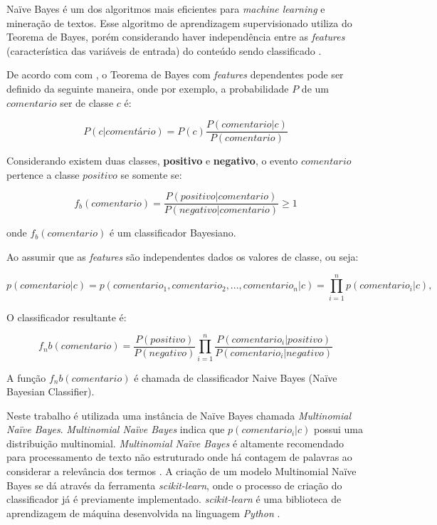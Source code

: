 Naïve Bayes é um dos algoritmos mais eficientes para \textit{machine learning} e mineração de textos. Esse algoritmo de aprendizagem supervisionado utiliza do Teorema de Bayes, porém considerando haver independência entre as \textit{features} (característica das variáveis de entrada) do conteúdo sendo classificado \cite{zhang2004optimalitybayes}.

De acordo com com \cite{zhang2004optimalitybayes}, o Teorema de Bayes com \textit{features} dependentes pode ser definido da seguinte maneira, onde por exemplo, a probabilidade $P$ de um $comentario$ ser de classe $c$ é:

\begin{equation}
\label{eq:bayes_classic}
 P(c|comentário) = P(c) \frac{P(comentario |c)}{P(comentario)}
\end{equation}

Considerando existem duas classes, \textbf{positivo} e \textbf{negativo}, o evento $comentario$ pertence a classe $positivo$ se somente se:

\begin{equation}
\label{eq:bayes_classic}
 {f_b}(comentario) =  \frac{P(positivo| comentario)}{P(negativo| comentario)} \geq 1
 
\end{equation}

onde ${f_b}(comentario)$ é um classificador Bayesiano.

Ao assumir que as \textit{features} são independentes dados os valores de classe, ou seja:

\begin{equation}
\label{eq:naive_bayes}
 {p}(comentario|c) =  {p}({comentario_1, comentario_2, ..., comentario_n}|c) = \prod_{i=1}^{n} {p}(comentario_i|c),
\end{equation}

O classificador resultante é:

\begin{equation}
\label{eq:bayes_classic}
 {f_nb}(comentario) =  \frac{P(positivo)}{P(negativo)} \prod_{i=1}^{n} \frac{P({comentario_i} | positivo)}{P({comentario_i} | negativo)}
\end{equation}

A função ${f_nb}(comentario)$ é chamada de classificador Naive Bayes (Naïve Bayesian Classifier).


Neste trabalho é utilizada uma instância de Naïve Bayes chamada \textit{Multinomial Naïve Bayes}. \textit{Multinomial Naïve Bayes} indica que ${p}(comentario_i|c)$ possui uma distribuição multinomial. \textit{Multinomial Naïve Bayes} é altamente recomendado para processamento de texto não estruturado onde há contagem de palavras ao considerar a relevância dos termos \cite{metsis2006whichnaivebayes}.
A criação de um modelo Multinomial Naïve Bayes se dá através da ferramenta \textit{scikit-learn}, onde o processo de criação do classificador já é previamente implementado. \textit{scikit-learn} é uma biblioteca de aprendizagem de máquina desenvolvida na linguagem \textit{Python} \cite{scikit-learn}. 


